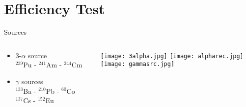 \documentclass[10pt]{beamer}
\begin{document}
\section{Efficiency Test}
\begin{frame}{Sources}
	\begin{columns}
		\begin{column}{0.5\textwidth}
			\begin{overlayarea}{\textwidth}{\textheight}
				\centering
				\color{red}{Detection Efficiency\\ of the different detectors}
				\vspace{0.1\textheight}

				\begin{itemize}
					\item[1$\rightarrow$]{3-$\alpha$ source \\
										\small$^{239}$Pu - $^{241}$Am - $^{244}$Cm}
					\item[5$\rightarrow$]{$\gamma$ sources \\
										\small $^{133}$Ba - $^{210}$Pb - $^{60}$Co \\
										$^{137}$Cs - $^{152}$Eu}
				\end{itemize}
				\center
				\vspace{0.1\textheight}
				\hspace{-0.2\textwidth}
			\end{overlayarea}
		\end{column}
		\begin{column}{0.5\textwidth}
			\begin{overlayarea}{\textwidth}{\textheight}
				\centering
				\vspace{-0.12\textheight}\texttt{[image: 3alpha.jpg]}
				\texttt{[image: alpharec.jpg]}\\
				\vspace{0.01\textheight}
				\texttt{[image: gammasrc.jpg]}
			\end{overlayarea}
		\end{column}
	\end{columns}
\end{frame}
\end{document}
